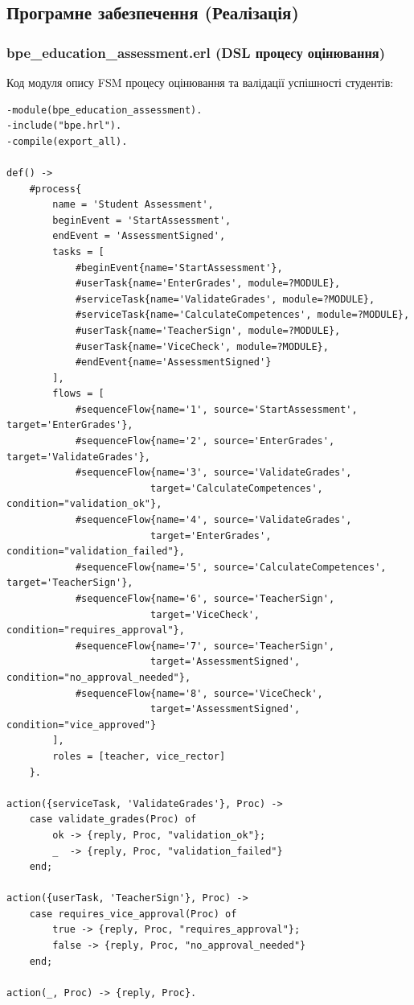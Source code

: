 \documentclass{article}
\begin{document}
\subsection{Програмне забезпечення (Реалізація)}

\subsubsection{bpe\_education\_assessment.erl (DSL процесу оцінювання)}
Код модуля опису FSM процесу оцінювання та валідації успішності студентів:
\begin{verbatim}
-module(bpe_education_assessment).
-include("bpe.hrl").
-compile(export_all).

def() ->
    #process{
        name = 'Student Assessment',
        beginEvent = 'StartAssessment',
        endEvent = 'AssessmentSigned',
        tasks = [
            #beginEvent{name='StartAssessment'},
            #userTask{name='EnterGrades', module=?MODULE},
            #serviceTask{name='ValidateGrades', module=?MODULE},
            #serviceTask{name='CalculateCompetences', module=?MODULE},
            #userTask{name='TeacherSign', module=?MODULE},
            #userTask{name='ViceCheck', module=?MODULE},
            #endEvent{name='AssessmentSigned'}
        ],
        flows = [
            #sequenceFlow{name='1', source='StartAssessment', target='EnterGrades'},
            #sequenceFlow{name='2', source='EnterGrades', target='ValidateGrades'},
            #sequenceFlow{name='3', source='ValidateGrades', 
                         target='CalculateCompetences', condition="validation_ok"},
            #sequenceFlow{name='4', source='ValidateGrades', 
                         target='EnterGrades', condition="validation_failed"},
            #sequenceFlow{name='5', source='CalculateCompetences', target='TeacherSign'},
            #sequenceFlow{name='6', source='TeacherSign', 
                         target='ViceCheck', condition="requires_approval"},
            #sequenceFlow{name='7', source='TeacherSign', 
                         target='AssessmentSigned', condition="no_approval_needed"},
            #sequenceFlow{name='8', source='ViceCheck', 
                         target='AssessmentSigned', condition="vice_approved"}
        ],
        roles = [teacher, vice_rector]
    }.

action({serviceTask, 'ValidateGrades'}, Proc) ->
    case validate_grades(Proc) of
        ok -> {reply, Proc, "validation_ok"};
        _  -> {reply, Proc, "validation_failed"}
    end;

action({userTask, 'TeacherSign'}, Proc) ->
    case requires_vice_approval(Proc) of
        true -> {reply, Proc, "requires_approval"};
        false -> {reply, Proc, "no_approval_needed"}
    end;

action(_, Proc) -> {reply, Proc}.
\end{verbatim}
\end{document}
